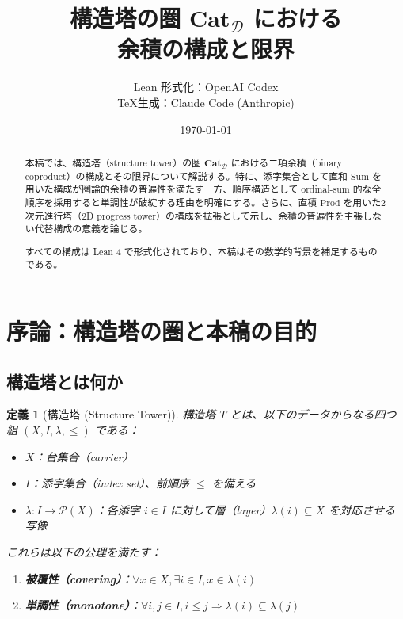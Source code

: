 \documentclass[a4paper,12pt]{ltjsarticle}
\title{構造塔の圏 $\mathbf{Cat}_{\mathcal{D}}$ における\\余積の構成と限界}
\author{%
    Lean 形式化：OpenAI Codex \\
    \TeX 生成：Claude Code (Anthropic)
}
\date{\today}
\newtheorem{definition}{定義}[section]
\theoremstyle{definition}
\begin{document}
\maketitle

\begin{abstract}
本稿では、構造塔（structure tower）の圏 $\mathbf{Cat}_{\mathcal{D}}$ における二項余積（binary coproduct）の構成とその限界について解説する。特に、添字集合として直和 $\mathrm{Sum}$ を用いた構成が圏論的余積の普遍性を満たす一方、順序構造として ordinal-sum 的な全順序を採用すると単調性が破綻する理由を明確にする。さらに、直積 $\mathrm{Prod}$ を用いた2次元進行塔（2D progress tower）の構成を拡張として示し、余積の普遍性を主張しない代替構成の意義を論じる。

すべての構成は Lean 4 で形式化されており、本稿はその数学的背景を補足するものである。
\end{abstract}

\tableofcontents

\section{序論：構造塔の圏と本稿の目的}

\subsection{構造塔とは何か}

\begin{definition}[構造塔 (Structure Tower)]
構造塔 $T$ とは、以下のデータからなる四つ組 $(X, I, \lambda, \leq)$ である：
\begin{itemize}
    \item $X$：台集合（carrier）
    \item $I$：添字集合（index set）、前順序 $\leq$ を備える
    \item $\lambda : I \to \mathcal{P}(X)$：各添字 $i \in I$ に対して層（layer）$\lambda(i) \subseteq X$ を対応させる写像
\end{itemize}
これらは以下の公理を満たす：
\begin{enumerate}
    \item \textbf{被覆性（covering）}：$\forall x \in X, \exists i \in I, x \in \lambda(i)$
    \item \textbf{単調性（monotone）}：$\forall i, j \in I, i \leq j \Rightarrow \lambda(i) \subseteq \lambda(j)$
\end{enumerate}
\end{definition}
\end{document}
